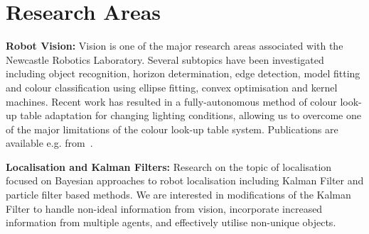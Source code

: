 \documentclass{llncs}
\begin{document}



\section{Research Areas}

\noindent\textbf{Robot Vision:} Vision is one of the major research areas associated with the Newcastle Robotics Laboratory. Several subtopics have been investigated including object recognition, horizon determination, edge detection, model fitting and colour classification using ellipse fitting, convex optimisation and kernel machines. Recent work has resulted in a fully-autonomous method of colour look-up table adaptation for changing lighting conditions, allowing us to overcome one of the major limitations of the colour look-up table system. Publications are available e.g. from~\cite{budden2012colour,budden2012ball,henderson_2007,nickin_2007,NUBOT2006,Henderson2008,flannery2013ransac,budden2013salient,chalup2014flfc,renton2014robotx}.


\noindent\textbf{Localisation and Kalman Filters:} Research on the
topic of localisation focused on Bayesian approaches to robot
localisation including Kalman Filter and particle filter
based methods. We are interested in
modifications of the Kalman Filter to handle non-ideal information
from vision, incorporate increased information from multiple agents,
and effectively utilise non-unique objects.
\end{document}
